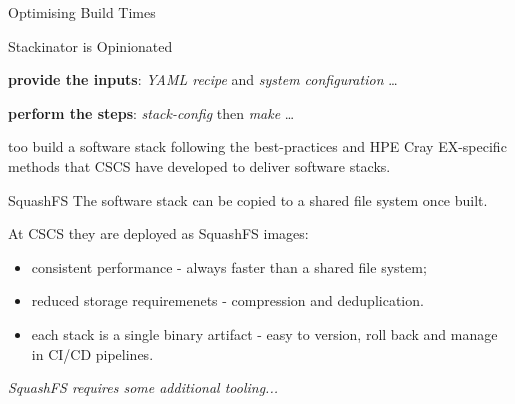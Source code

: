 \documentclass[aspectratio=43]{beamer}
\begin{document}
\begin{frame}[fragile]{Optimising Build Times}
    \begin{center}
        
    \end{center}
\end{frame}
\begin{frame}[fragile]{Stackinator is Opinionated}
    \begin{center}
        \textbf{provide the inputs}: \emph{YAML recipe} and \emph{system configuration} \dots

    \vspace{20pt}

        \textbf{perform the steps}: \emph{stack-config} then \emph{make} \dots

    \vspace{20pt}
     too build a software stack following the best-practices and HPE Cray EX-specific methods that CSCS have developed to deliver software stacks.
    \end{center}
\end{frame}



\begin{frame}[fragile]{SquashFS}
    The software stack can be copied to a shared file system once built.

    \vspace{20pt}

    At CSCS they are deployed as SquashFS images:
    \begin{itemize}
        \item consistent performance - always faster than a shared file system;
        \item reduced storage requiremenets - compression and deduplication.
        \item each stack is a single binary artifact - easy to version, roll back and manage in CI/CD pipelines.
    \end{itemize}

    \vspace{20pt}

    \begin{center}
    \emph{SquashFS requires some additional tooling...}
    \end{center}
\end{frame}
\end{document}
